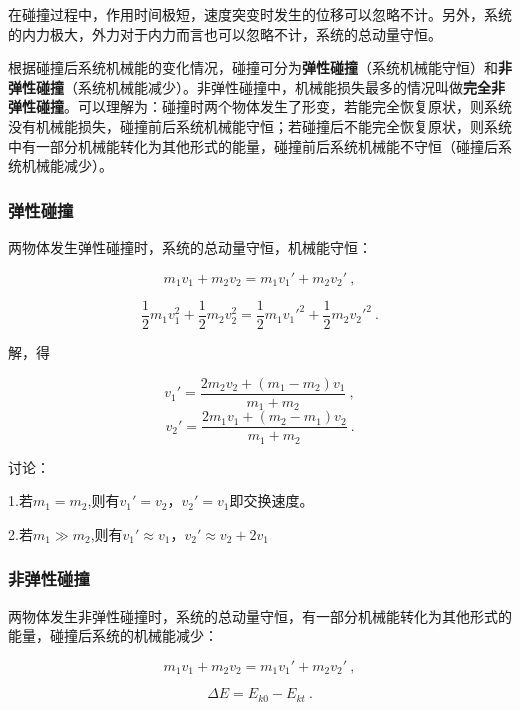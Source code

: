 在碰撞过程中，作用时间极短，速度突变时发生的位移可以忽略不计。另外，系统的内力极大，外力对于内力而言也可以忽略不计，系统的总动量守恒。

根据碰撞后系统机械能的变化情况，碰撞可分为\textbf{弹性碰撞}（系统机械能守恒）和\textbf{非弹性碰撞}（系统机械能减少）。非弹性碰撞中，机械能损失最多的情况叫做\textbf{完全非弹性碰撞}。可以理解为：碰撞时两个物体发生了形变，若能完全恢复原状，则系统没有机械能损失，碰撞前后系统机械能守恒；若碰撞后不能完全恢复原状，则系统中有一部分机械能转化为其他形式的能量，碰撞前后系统机械能不守恒（碰撞后系统机械能减少）。

\subsubsection{弹性碰撞}

两物体发生弹性碰撞时，系统的总动量守恒，机械能守恒：

\begin{equation}
m_1v_1+m_2v_2=m_1v_1'+m_2v_2'~,
\end{equation}

\begin{equation}
\frac12m_1v_1^2+\frac12m_2v_2^2=\frac12m_1v_1'^2+\frac12m_2v_2'^2~.
\end{equation}

解，得

\begin{equation}
v_1'= \frac{2m_2v_2 + (m_1 - m_2)v_1}{m_1+m_2}~,
\end{equation}
\begin{equation}
v_2'= \frac{2m_1v_1 + (m_2 - m_1)v_2}{m_1+m_2}~.
\end{equation}

讨论：

1.若$m_1=m_2$,则有$v_1'=v_2$，$v_2'=v_1$即交换速度。

2.若$m_1\gg m_2$,则有$v_1'\approx v_1$，$v_2'\approx v_2+2v_1$

\subsubsection{非弹性碰撞}

两物体发生非弹性碰撞时，系统的总动量守恒，有一部分机械能转化为其他形式的能量，碰撞后系统的机械能减少：

\begin{equation}
m_1v_1+m_2v_2=m_1v_1'+m_2v_2'~,
\end{equation}

\begin{equation}
\Delta E = E_{k0}-E_{kt}~.
\end{equation}

